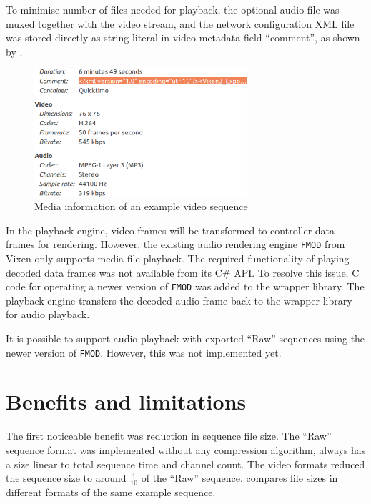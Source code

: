 To minimise number of files needed for playback, the optional audio file was muxed together with the video stream, and the network configuration XML file was stored directly as string literal in video metadata field ``comment'', as shown by .

\begin{figure}[t]
  \centering
  \includegraphics[width=0.7\textwidth]{Figs/video_info.png}
  \caption{\footnotesize Media information of an example video sequence}
  \label{fig:video-info}
\end{figure}

In the playback engine, video frames will be transformed to controller data frames for rendering. However, the existing audio rendering engine \texttt{FMOD} from Vixen only supports media file playback. The required functionality of playing decoded data frames was not available from its C\# API. To resolve this issue, C code for operating a newer version of \texttt{FMOD} was added to the wrapper library. The playback engine transfers the decoded audio frame back to the wrapper library for audio playback.

It is possible to support audio playback with exported ``Raw'' sequences using the newer version of \texttt{FMOD}. However, this was not implemented yet.


\section{Benefits and limitations}

The first noticeable benefit was reduction in sequence file size. The ``Raw'' sequence format was implemented without any compression algorithm, always has a size linear to total sequence time and channel count. The video formats reduced the sequence size to around $\frac{1}{10}$ of the ``Raw'' sequence.  compares file sizes in different formats of the same example sequence.

